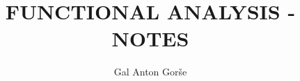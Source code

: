 \documentclass[10pt, a4paper]{article}
\numberwithin{equation}{section}
\begin{document}
\title{FUNCTIONAL ANALYSIS - NOTES}
\author{Gal Anton Gorše}
\date{}
\maketitle

\tableofcontents















 
 
\end{document}
